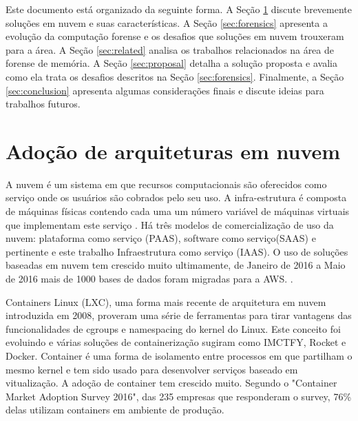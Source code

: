 \documentclass[conference]{IEEEtran}
\newcommand{\marcos}[1]{{\color{blue}{MARCOS: #1}}}
\begin{document}
Este documento está organizado da seguinte forma.
%
A Seção \ref{sec:cloud} discute brevemente soluções em nuvem e suas características.
%
A Seção \ref{sec:forensics} apresenta a evolução da computação forense e os desafios que soluções em nuvem trouxeram para a área.
%
A Seção \ref{sec:related} analisa os trabalhos relacionados na área de forense de memória.
%
A Seção \ref{sec:proposal} detalha a solução proposta e avalia como ela trata os desafios descritos na Seção \ref{sec:forensics}.
%
Finalmente, a Seção \ref{sec:conclusion} apresenta algumas considerações finais e discute ideias para trabalhos futuros.

\section{Adoção de arquiteturas em nuvem}
\label{sec:cloud}

A nuvem é um sistema em que recursos computacionais são oferecidos como serviço onde os usuários são cobrados pelo seu uso. A infra-estrutura é composta de máquinas físicas
contendo cada uma um número variável de máquinas virtuais que implementam este serviço \cite{Sousa2009}. Há três modelos de comercialização de uso da nuvem: plataforma como serviço (PAAS), 
software como serviço(SAAS) e pertinente e este trabalho Infraestrutura como serviço (IAAS). O uso de soluções baseadas em nuvem tem crescido muito ultimamente, de Janeiro 
de 2016 a Maio de 2016 mais de 1000 bases de dados foram migradas para a AWS. \cite{Amazon2016}.

Containers Linux (LXC), uma forma mais recente de arquitetura em nuvem introduzida em 2008, proveram uma série de ferramentas para tirar vantagens das funcionalidades 
de cgroups e namespacing do kernel do Linux. Este conceito foi evoluindo e várias soluções de containerização sugiram como IMCTFY, Rocket e Docker. Container é uma forma 
de isolamento entre processos em que partilham o mesmo kernel e tem sido usado para desenvolver serviços baseado em vitualização. A adoção de container tem 
crescido muito. Segundo o "Container Market Adoption Survey 2016", das 235 empresas que responderam o survey, 76\% delas utilizam containers em ambiente de produção.
\end{document}
